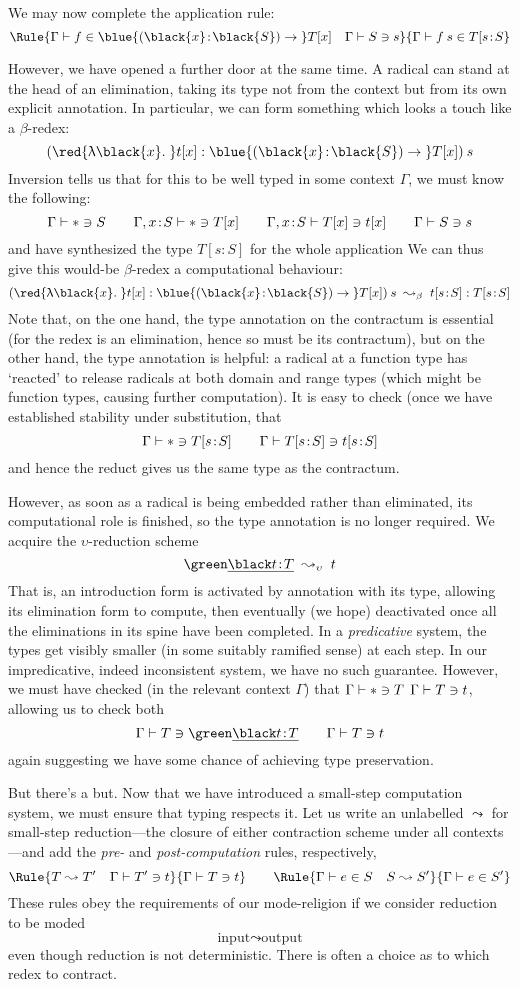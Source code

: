 \documentclass[natbib]{article}
\newcommand{\type}{\ast}
\newcommand{\hb}{\!:\!}
\newcommand{\PI}[2]{\blue{(\black{#1}\hb \black{#2})\to\;}}
\newcommand{\LA}[1]{\red{\uplambda\black{#1}.\;}}
\begin{document}
We may now complete the application rule:
\[
\Rule{\SYN\Gamma f {\PI xS T[x]} \quad \CHK\Gamma Ss}
     {\SYN\Gamma{f\:s}{T[s\hb S}}
\]

However, we have opened a further door at the same time. A radical can stand at the head of an elimination, taking its type not from the context but from its own explicit annotation. In particular, we can form something which looks a touch like a $\beta$-redex:
\[
(\LA xt[x] : \PI xS T[x])\:s
\]
Inversion tells us that for this to be well typed in some context $\Gamma$, we must know the following:
\[
\CHK\Gamma\type S \qquad
\CHK{\Gamma,x\hb S}\type{T[x]} \qquad
\CHK{\Gamma,x\hb S}{T[x]}{t[x]} \qquad
\CHK\Gamma Ss
\]
and have synthesized the type $T[s\hb S]$ for the whole application
We can thus give this would-be $\beta$-redex a computational behaviour:
\[
(\LA xt[x] : \PI xS T[x])\:s \;\leadsto_\beta\; t[s\hb S]:T[s\hb S]
\]
Note that, on the one hand, the type annotation on the contractum is essential (for the redex is an elimination, hence so must be its contractum), but on the other hand, the type annotation is helpful: a radical at a function type has `reacted' to release radicals at both domain and range types (which might be function types, causing further computation). It is easy to check (once we have established stability under substitution, that
\[
\CHK\Gamma\type{T[s\hb S]} \qquad
\CHK\Gamma{T[s\hb S]}{t[s\hb S]}
\]
and hence the reduct gives us the same type as the contractum.

However, as soon as a radical is being embedded rather than eliminated, its computational role is finished, so the type annotation is no longer required. We acquire the $\upsilon$-reduction scheme
\[
\el{t\hb T} \;\leadsto_\upsilon\; t
\]
That is, an introduction form is activated by annotation with its type, allowing its elimination form to compute, then eventually (we hope) deactivated once all the eliminations in its spine have been completed. In a \emph{predicative} system, the types get visibly smaller (in some suitably ramified sense) at each step. In our impredicative, indeed inconsistent system, we have no such guarantee. However, we must have checked (in the relevant context $\Gamma$) that $\CHK\Gamma\type T$ $\Gamma \vdash T \ni t$, allowing us to check both
\[
\CHK\Gamma T{\el{t\hb T}} \qquad \CHK\Gamma Tt
\]
again suggesting we have some chance of achieving type preservation.

But there's a but. Now that we have introduced a small-step computation system, we must ensure that typing respects it. Let us write an unlabelled $\leadsto$ for small-step reduction---the closure of either contraction scheme under all contexts---and add the \emph{pre-} and \emph{post-computation} rules, respectively,
\[
\Rule{T\leadsto T'\quad \CHK\Gamma{T'}t}
     {\CHK\Gamma Tt}
\qquad
\Rule{\SYN\Gamma eS \quad S\leadsto S'}
     {\SYN\Gamma e{S'}}
\]
These rules obey the requirements of our mode-religion if we consider reduction to be moded
\[
\mbox{input}\leadsto\mbox{output}
\]
even though reduction is not deterministic. There is often a choice as to which redex to contract.
\end{document}

